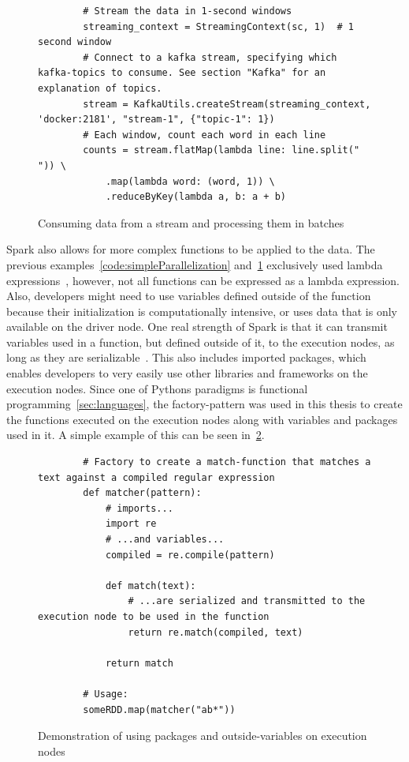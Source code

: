 \begin{figure}
    \caption{Consuming data from a stream and processing them in batches}
    \label{code:wordcount}
    \begin{verbatim}
        # Stream the data in 1-second windows
        streaming_context = StreamingContext(sc, 1)  # 1 second window
        # Connect to a kafka stream, specifying which kafka-topics to consume. See section "Kafka" for an explanation of topics.
        stream = KafkaUtils.createStream(streaming_context, 'docker:2181', "stream-1", {"topic-1": 1})
        # Each window, count each word in each line
        counts = stream.flatMap(lambda line: line.split(" ")) \
            .map(lambda word: (word, 1)) \
            .reduceByKey(lambda a, b: a + b)
    \end{verbatim}
\end{figure}

Spark also allows for more complex functions to be applied to the data.
The previous examples~\ref{code:simpleParallelization} and~\ref{code:wordcount} exclusively used lambda expressions~\cite{pythonDocs},
however, not all functions can be expressed as a lambda expression.
Also, developers might need to use variables defined outside of the function because their initialization is computationally intensive,
or uses data that is only available on the driver node.
One real strength of Spark is that it can transmit variables used in a function, but defined outside of it, to the execution nodes, as long as they are serializable~\cite{sparkDocs}.
This also includes imported packages, which enables developers to very easily use other libraries and frameworks on the execution nodes.
Since one of Pythons paradigms is functional programming~\ref{sec:languages},
the factory-pattern was used in this thesis to create the functions executed on the execution nodes along with variables and packages used in it.
A simple example of this can be seen in~\ref{code:factory}.

\begin{figure}
    \caption{Demonstration of using packages and outside-variables on execution nodes}
    \label{code:factory}
    \begin{verbatim}
        # Factory to create a match-function that matches a text against a compiled regular expression
        def matcher(pattern):
            # imports...
            import re
            # ...and variables...
            compiled = re.compile(pattern)

            def match(text):
                # ...are serialized and transmitted to the execution node to be used in the function
                return re.match(compiled, text)

            return match

        # Usage:
        someRDD.map(matcher("ab*"))
    \end{verbatim}
\end{figure}

